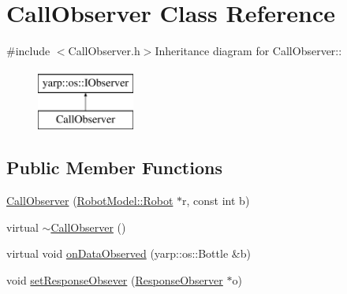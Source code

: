 \hypertarget{class_call_observer}{
\section{CallObserver Class Reference}
\label{class_call_observer}
}


{\ttfamily \#include $<$CallObserver.h$>$}Inheritance diagram for CallObserver::\begin{figure}[H]
\begin{center}
\leavevmode
\includegraphics[height=2cm]{class_call_observer}
\end{center}
\end{figure}
\subsection*{Public Member Functions}
\begin{DoxyCompactItemize}
\item 
\hyperlink{class_call_observer_abc4eedb5f415fe0573cbd652554a5cd3}{CallObserver} (\hyperlink{class_robot_model_1_1_robot}{RobotModel::Robot} $\ast$r, const int b)
\item 
virtual \hyperlink{class_call_observer_aa357a50f75f42bfc944af11f41265fee}{$\sim$CallObserver} ()
\item 
virtual void \hyperlink{class_call_observer_abc1974fe2f04101dbbb1ae3ce83e7bfe}{onDataObserved} (yarp::os::Bottle \&b)
\item 
void \hyperlink{class_call_observer_a7551cd8674e37faa25451d78150f6a7c}{setResponseObsever} (\hyperlink{class_response_observer}{ResponseObserver} $\ast$o)
\end{DoxyCompactItemize}


